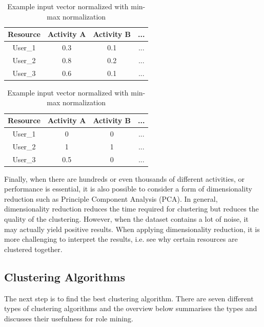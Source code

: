 \begin{table}
  \parbox{.45\linewidth}{
    \centering
    \begin{tabular}{cccc}
    \hline
    Resource& Activity A & Activity B & ... \\
    \hline
	User\_1 & 0.3 & 0.1 & ... \\
	User\_2 & 0.8 & 0.2 & ... \\
	User\_3 & 0.6 & 0.1 & ... \\
    \hline
    \end{tabular}
    \caption{Example relative activity frequencies input vector}
    \label{table:input}
  }
\hfill
  \parbox{.45\linewidth}{
    \centering
    \begin{tabular}{cccc}
    \hline
    Resource& Activity A & Activity B & ... \\
    \hline
	User\_1 & 0 & 0 & ...\\
	User\_2 & 1 & 1 & ...\\
	User\_3 & 0.5 & 0 & ...\\
    \hline
  \end{tabular}
  \caption{Example input vector normalized with min-max normalization}
  \label{table:input_normalized}
}
\end{table}

Finally, when there are hundreds or even thousands of different activities, or performance is essential, it is also possible to consider a form of dimensionality reduction such as Principle Component Analysis (PCA). In general, dimensionality reduction reduces the time required for clustering but reduces the quality of the clustering. However, when the dataset contains a lot of noise, it may actually yield positive results. When applying dimensionality reduction, it is more challenging to interpret the results, i.e. see why certain resources are clustered together. 

\subsection{Clustering Algorithms}
The next step is to find the best clustering algorithm. There are seven different types of clustering algorithms and the overview below summarises the types and discusses their usefulness for role mining. 

